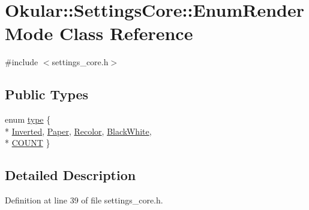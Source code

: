 \hypertarget{classOkular_1_1SettingsCore_1_1EnumRenderMode}{\section{Okular\+:\+:Settings\+Core\+:\+:Enum\+Render\+Mode Class Reference}
\label{classOkular_1_1SettingsCore_1_1EnumRenderMode}
}


{\ttfamily \#include $<$settings\+\_\+core.\+h$>$}

\subsection*{Public Types}
\begin{DoxyCompactItemize}
\item 
enum \hyperlink{classOkular_1_1SettingsCore_1_1EnumRenderMode_aae172bdb345dda4d639e763709ea357a}{type} \{ \\*
\hyperlink{classOkular_1_1SettingsCore_1_1EnumRenderMode_aae172bdb345dda4d639e763709ea357aae3a52d8c06b668f28a3f3d646c49d3b0}{Inverted}, 
\hyperlink{classOkular_1_1SettingsCore_1_1EnumRenderMode_aae172bdb345dda4d639e763709ea357aa58af23c7fbd8ea1998995a8eaffa125d}{Paper}, 
\hyperlink{classOkular_1_1SettingsCore_1_1EnumRenderMode_aae172bdb345dda4d639e763709ea357aa4ed9520dc788e5254440ebd166aedbd8}{Recolor}, 
\hyperlink{classOkular_1_1SettingsCore_1_1EnumRenderMode_aae172bdb345dda4d639e763709ea357aacfc5ee223333e478da6fb379a9eaa23a}{Black\+White}, 
\\*
\hyperlink{classOkular_1_1SettingsCore_1_1EnumRenderMode_aae172bdb345dda4d639e763709ea357aae8b9a005a7b38b65d267ba7b2827e33e}{C\+O\+U\+N\+T}
 \}
\end{DoxyCompactItemize}


\subsection{Detailed Description}


Definition at line 39 of file settings\+\_\+core.\+h.



